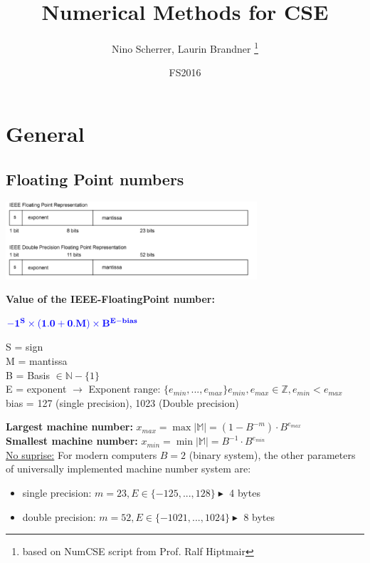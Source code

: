 \documentclass[12pt, a4paper]{article}
\title{Numerical Methods for CSE}
\author{Nino Scherrer, Laurin Brandner \thanks{based on NumCSE script from Prof. Ralf Hiptmair}}
\date{FS2016}
\newcommand{\M}{\mathbb{M}}
\begin{document}
\begin{titlepage}
\maketitle
\end{titlepage}
 
 
\section{General}

\subsection{Floating Point numbers}

\begin{center}
\includegraphics[width=0.7\textwidth]{floatingPoint_IEEE_layout.png}
\end{center}

\begin{tcolorbox}
	\textbf{Value of the IEEE-FloatingPoint number:} 
	\begin{center}
		$\color{blue}\mathbf{-1^{S} \times (1.0 + 0.M) \times B^{E-bias}}$ 
	\end{center}
	
 S = sign \\
 M = mantissa \\
 B = Basis $\in \mathbb{N}-\lbrace 1 \rbrace$ \\
 E = exponent  $\rightarrow $ Exponent range: $\lbrace e_{min}, ..., e_{max} \rbrace e_{min}, e_{max} \in \mathbb{Z}, e_{min} < e_{max}$ \\
 bias = 127 (single precision), 1023 (Double precision)
\end{tcolorbox}

\textbf{Largest machine number:} $x_{max} = \max|\M| = (1 - B^{-m}) \cdot  B^{e_{max}} $ \\
\textbf{Smallest machine number:} $x_{min} = \min|\M| = B^{-1} \cdot B^{e_{min}}$ \\

\underline{No suprise:} For modern computers $B = 2$ (binary system), the other parameters of universally implemented machine number system are:
\begin{itemize}
	\item single precision: $m=23, E \in \lbrace -125, ..., 128\rbrace \blacktriangleright$ 4 bytes 
	\item double precision: $m=52, E \in \lbrace -1021, ..., 1024 \rbrace \blacktriangleright $ 8 bytes 
\end{itemize}
\end{document}
